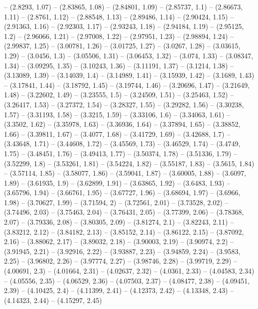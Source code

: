 -- (2.8293, 1.07)
-- (2.83865, 1.08)
-- (2.84801, 1.09)
-- (2.85737, 1.1)
-- (2.86673, 1.11)
-- (2.8761, 1.12)
-- (2.88548, 1.13)
-- (2.89486, 1.14)
-- (2.90424, 1.15)
-- (2.91363, 1.16)
-- (2.92303, 1.17)
-- (2.93243, 1.18)
-- (2.94184, 1.19)
-- (2.95125, 1.2)
-- (2.96066, 1.21)
-- (2.97008, 1.22)
-- (2.97951, 1.23)
-- (2.98894, 1.24)
-- (2.99837, 1.25)
-- (3.00781, 1.26)
-- (3.01725, 1.27)
-- (3.0267, 1.28)
-- (3.03615, 1.29)
-- (3.0456, 1.3)
-- (3.05506, 1.31)
-- (3.06453, 1.32)
-- (3.074, 1.33)
-- (3.08347, 1.34)
-- (3.09295, 1.35)
-- (3.10243, 1.36)
-- (3.11191, 1.37)
-- (3.1214, 1.38)
-- (3.13089, 1.39)
-- (3.14039, 1.4)
-- (3.14989, 1.41)
-- (3.15939, 1.42)
-- (3.1689, 1.43)
-- (3.17841, 1.44)
-- (3.18792, 1.45)
-- (3.19744, 1.46)
-- (3.20696, 1.47)
-- (3.21649, 1.48)
-- (3.22602, 1.49)
-- (3.23555, 1.5)
-- (3.24509, 1.51)
-- (3.25463, 1.52)
-- (3.26417, 1.53)
-- (3.27372, 1.54)
-- (3.28327, 1.55)
-- (3.29282, 1.56)
-- (3.30238, 1.57)
-- (3.31193, 1.58)
-- (3.3215, 1.59)
-- (3.33106, 1.6)
-- (3.34063, 1.61)
-- (3.3502, 1.62)
-- (3.35978, 1.63)
-- (3.36936, 1.64)
-- (3.37894, 1.65)
-- (3.38852, 1.66)
-- (3.39811, 1.67)
-- (3.4077, 1.68)
-- (3.41729, 1.69)
-- (3.42688, 1.7)
-- (3.43648, 1.71)
-- (3.44608, 1.72)
-- (3.45569, 1.73)
-- (3.46529, 1.74)
-- (3.4749, 1.75)
-- (3.48451, 1.76)
-- (3.49413, 1.77)
-- (3.50374, 1.78)
-- (3.51336, 1.79)
-- (3.52299, 1.8)
-- (3.53261, 1.81)
-- (3.54224, 1.82)
-- (3.55187, 1.83)
-- (3.5615, 1.84)
-- (3.57114, 1.85)
-- (3.58077, 1.86)
-- (3.59041, 1.87)
-- (3.60005, 1.88)
-- (3.6097, 1.89)
-- (3.61935, 1.9)
-- (3.62899, 1.91)
-- (3.63865, 1.92)
-- (3.6483, 1.93)
-- (3.65796, 1.94)
-- (3.66761, 1.95)
-- (3.67727, 1.96)
-- (3.68694, 1.97)
-- (3.6966, 1.98)
-- (3.70627, 1.99)
-- (3.71594, 2)
-- (3.72561, 2.01)
-- (3.73528, 2.02)
-- (3.74496, 2.03)
-- (3.75463, 2.04)
-- (3.76431, 2.05)
-- (3.77399, 2.06)
-- (3.78368, 2.07)
-- (3.79336, 2.08)
-- (3.80305, 2.09)
-- (3.81274, 2.1)
-- (3.82243, 2.11)
-- (3.83212, 2.12)
-- (3.84182, 2.13)
-- (3.85152, 2.14)
-- (3.86122, 2.15)
-- (3.87092, 2.16)
-- (3.88062, 2.17)
-- (3.89032, 2.18)
-- (3.90003, 2.19)
-- (3.90974, 2.2)
-- (3.91945, 2.21)
-- (3.92916, 2.22)
-- (3.93887, 2.23)
-- (3.94859, 2.24)
-- (3.9583, 2.25)
-- (3.96802, 2.26)
-- (3.97774, 2.27)
-- (3.98746, 2.28)
-- (3.99719, 2.29)
-- (4.00691, 2.3)
-- (4.01664, 2.31)
-- (4.02637, 2.32)
-- (4.0361, 2.33)
-- (4.04583, 2.34)
-- (4.05556, 2.35)
-- (4.06529, 2.36)
-- (4.07503, 2.37)
-- (4.08477, 2.38)
-- (4.09451, 2.39)
-- (4.10425, 2.4)
-- (4.11399, 2.41)
-- (4.12373, 2.42)
-- (4.13348, 2.43)
-- (4.14323, 2.44)
-- (4.15297, 2.45)
